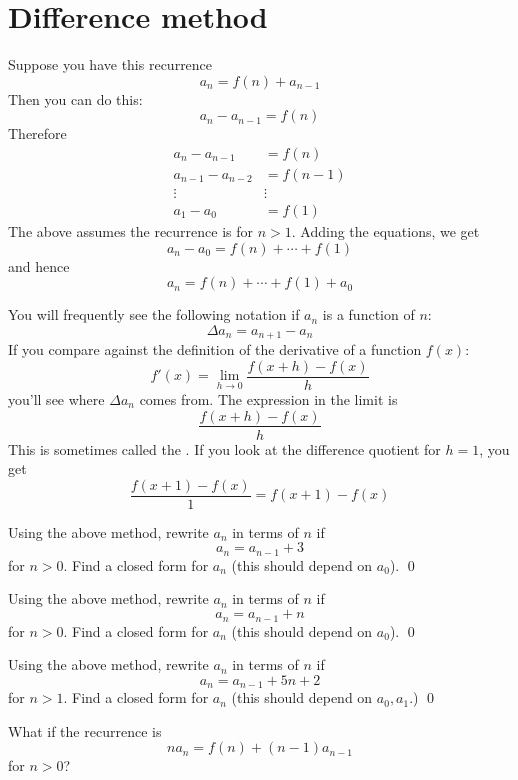 \section{Difference method}

Suppose you have this recurrence
\[
a_n = f(n) + a_{n-1}
\]
Then you can do this:
\[
a_n - a_{n-1} = f(n) 
\]
Therefore
\begin{align*}
a_n - a_{n-1} &= f(n) \\ 
a_{n-1} - a_{n-2} &= f(n-1) \\
\vdots & \vdots \\
a_1 - a_{0} &= f(1) 
\end{align*}
The above assumes the recurrence is for $n > 1$.
Adding the equations, we get
\[
a_n - a_0 = f(n) + \cdots + f(1)
\]
and hence
\[
a_n = f(n) + \cdots + f(1) + a_0
\]

You will frequently see the following notation if $a_n$ is a function of
$n$:
\[
\Delta a_n = a_{n+1} - a_n
\]
If you compare against the definition of the derivative of a function $f(x)$:
\[
f'(x) = \lim_{h \rightarrow 0} \frac{f(x+h) - f(x)}{h}
\]
you'll see where $\Delta a_n$ comes from.
The expression in the limit is
\[
\frac{f(x+h) - f(x)}{h}
\]
This is sometimes called the .
If you look at the difference quotient for $h = 1$,
you get
\[
\frac{f(x+1) - f(x)}{1} = f(x+1) - f(x)
\]

\newpage
\begin{ex}
  Using the above method, rewrite $a_n$ in terms of $n$ if
  \[
  a_n = a_{n-1} + 3
  \]
  for $n > 0$.
  Find a closed form for $a_n$ (this should depend on $a_0$).
  \qed
\end{ex}


\newpage
\begin{ex}
  Using the above method, rewrite $a_n$ in terms of $n$ if
  \[
  a_n = a_{n-1} + n
  \]
  for $n > 0$.
  Find a closed form for $a_n$ (this should depend on $a_0$).
  \qed
\end{ex}


\newpage
\begin{ex}
  Using the above method, rewrite $a_n$ in terms of $n$ if
  \[
  a_n = a_{n-1} + 5n + 2
  \]
  for $n > 1$.
  Find a closed form for $a_n$ (this should depend on $a_0, a_1$.)
  \qed
\end{ex}

\newpage
\begin{ex}
  What if the recurrence is
\[
na_n = f(n) + (n-1)a_{n-1}
\]
for $n > 0$?  
\end{ex}

